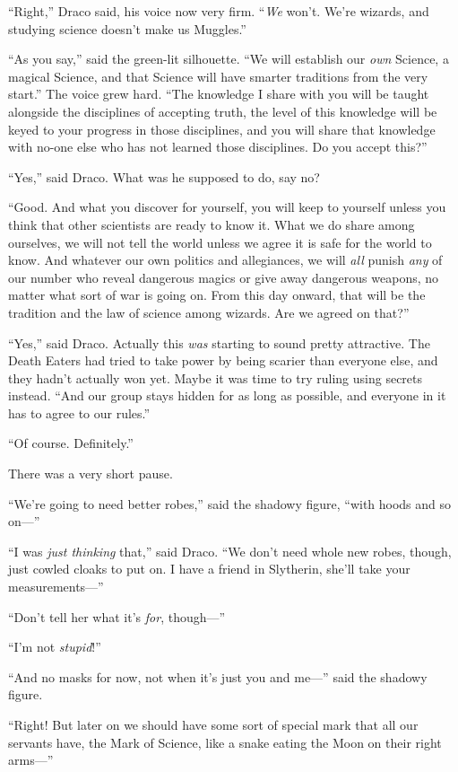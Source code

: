 “Right,” Draco said, his voice now very firm. “\emph{We} won’t. We’re wizards, and studying science doesn’t make us Muggles.”

“As you say,” said the green-lit silhouette. “We will establish our \emph{own} Science, a magical Science, and that Science will have smarter traditions from the very start.” The voice grew hard. “The knowledge I share with you will be taught alongside the disciplines of accepting truth, the level of this knowledge will be keyed to your progress in those disciplines, and you will share that knowledge with no-one else who has not learned those disciplines. Do you accept this?”

“Yes,” said Draco. What was he supposed to do, say no?

“Good. And what you discover for yourself, you will keep to yourself unless you think that other scientists are ready to know it. What we do share among ourselves, we will not tell the world unless we agree it is safe for the world to know. And whatever our own politics and allegiances, we will \emph{all} punish \emph{any} of our number who reveal dangerous magics or give away dangerous weapons, no matter what sort of war is going on. From this day onward, that will be the tradition and the law of science among wizards. Are we agreed on that?”

“Yes,” said Draco. Actually this \emph{was} starting to sound pretty attractive. The Death Eaters had tried to take power by being scarier than everyone else, and they hadn’t actually won yet. Maybe it was time to try ruling using secrets instead. “And our group stays hidden for as long as possible, and everyone in it has to agree to our rules.”

“Of course. Definitely.”

There was a very short pause.

“We’re going to need better robes,” said the shadowy figure, “with hoods and so on—”

“I was \emph{just thinking} that,” said Draco. “We don’t need whole new robes, though, just cowled cloaks to put on. I have a friend in Slytherin, she’ll take your measurements—”

“Don’t tell her what it’s \emph{for}, though—”

“I’m not \emph{stupid}!”

“And no masks for now, not when it’s just you and me—” said the shadowy figure.

“Right! But later on we should have some sort of special mark that all our servants have, the Mark of Science, like a snake eating the Moon on their right arms—”

